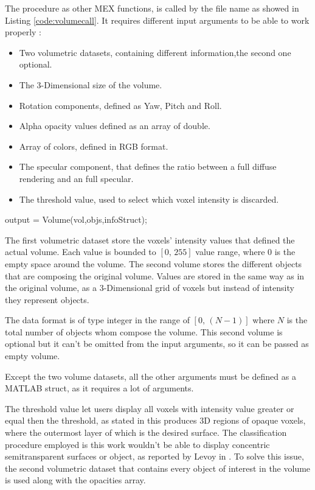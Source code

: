 \documentclass[12pt,a4paper]{extarticle}
\newcommand{\linespace}{\vspace{8pt}}
\begin{document}
The procedure as other MEX functions, is called by the file name as showed in Listing \ref{code:volumecall}. It requires different input arguments to be able to work properly :
\begin{itemize}
\item Two volumetric datasets, containing different information,the second one optional.
\item The 3-Dimensional size of the volume.
\item Rotation components, defined as Yaw, Pitch and Roll.
\item Alpha opacity values defined as an array of double.
\item Array of colors, defined in RGB format.
\item The specular component, that defines the ratio between a full diffuse rendering and an full specular. 
\item The threshold value, used to select which voxel intensity is discarded.
\end{itemize}

\begin{cpp}[caption={Volume rendering MEX function call with left and right arguments, respectively output and input arguments},label=code:volumecall]
output = Volume(vol,objs,infoStruct);
\end{cpp}

The first volumetric dataset store the voxels' intensity values that defined the actual volume. Each value is bounded to $[0,\,255]$ value range, where $0$ is the empty space around the volume. The second volume stores the different objects that are composing the original volume. Values are stored in the same way as in the original volume, as a 3-Dimensional grid of voxels but instead of intensity they represent objects. 

The data format is of type integer in the range of $[0,\,(N-1)]$ where $N$ is the total number of objects whom compose the volume. This second volume is optional but it can't be omitted from the input arguments, so it can be passed as empty volume.

Except the two volume datasets, all the other arguments must be defined as a MATLAB struct, as it requires a lot of arguments.
\linespace

The threshold value let users display all voxels with intensity value greater or equal then the threshold, as stated in %
this produces 3D regions of opaque voxels, where the outermost layer of which is the desired surface.
The classification procedure employed is this work wouldn't be able to display concentric semitransparent surfaces or object, as reported by Levoy in %
. To solve this issue, the second volumetric dataset that contains every object of interest in the volume is used along with the opacities array.
\linespace
\end{document}
